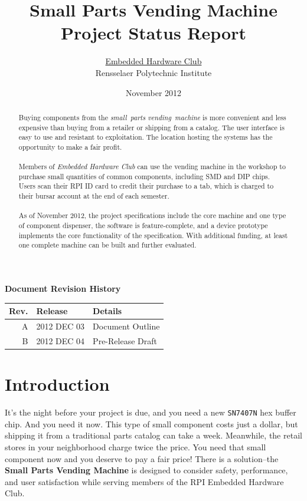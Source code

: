 \documentclass[12pt,oneside,final]{article}
\title{Small Parts Vending Machine\\ Project Status Report}
\author{\href{http://rpiEHC.org}{Embedded Hardware Club}\\ Rensselaer Polytechnic Institute}
\date{November 2012}
\begin{document}
\maketitle
\thispagestyle{empty}
\begin{abstract}
  \noindent
  Buying components from the \emph{small~parts vending~machine} is more convenient and less expensive than buying from a retailer or shipping from a catalog. The user interface is easy to use and resistant to exploitation. The location hosting the systems has the opportunity to make a fair profit.
  \\~\\
  \small
  Members of \emph{Embedded Hardware Club} can use the vending machine in the workshop to purchase small quantities of common components, including SMD and DIP chips. Users scan their RPI ID card to credit their purchase to a tab, which is charged to their bursar account at the end of each semester.
  \\~\\
  As of November 2012, the project specifications include the core machine and one type of component dispenser, the software is feature-complete, and a device prototype implements the core functionality of the specification. With additional funding, at least one complete machine can be built and further evaluated.
\end{abstract}
\pagebreak


\thispagestyle{empty}
\tableofcontents
\vfill
\begin{table}[b!]
  \centering
  \textbf{Document Revision History}\\
  \begin{tabular}{r | l l}
    \hline
    Rev.          & Release     & Details             \\
    \hline
    A             & 2012 DEC 03 & Document Outline    \\
    B             & 2012 DEC 04 & Pre-Release Draft   \\
    \hline
  \end{tabular}
\end{table}
\pagebreak


\section{Introduction}
\label{sec:intro}

It's the night before your project is due, and you need a new \texttt{SN7407N} hex buffer chip. And you need it now. This type of small component costs just a dollar, but shipping it from a traditional parts catalog can take a week. Meanwhile, the retail stores in your neighborhood charge twice the price. You need that small component now and you deserve to pay a fair price! There is a solution--the \textbf{Small Parts Vending Machine} is designed to consider safety, performance, and user satisfaction while serving members of the RPI Embedded Hardware Club.
\end{document}

